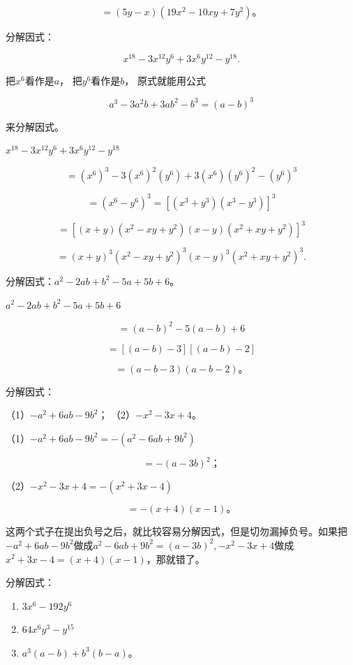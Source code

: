 \[
= (5 y - x) (19 x ^{2} - 10 x y + 7 y ^{2})\text{。}
\]

 分解因式：

\[
x ^{18} - 3 x ^{12} y ^{6} + 3 x ^{6} y ^{12} - y ^{18}.
\]

 把\(x^6\)看作是\(a\)， 把\(y^6\)看作是\(b\)，
原式就能用公式

\[
a ^{3} - 3 a ^{2} b + 3 a b ^{2} - b ^{3} = (a - b) ^{3}
\]

来分解因式。

\(x^{18} - 3x^{12}y^6 +3x^6 y^{12} - y^{18}\)

\[
= (x ^{6}) ^{3} - 3 (x ^{6}) ^{2} (y ^{6}) + 3 (x ^{6}) (y ^{6}) ^{2} - (y ^{6}) ^{3}
\]

\[
= \left(x ^{6} - y ^{6}\right) ^{3} = \left[ \left(x ^{3} + y ^{3}\right) \left(x ^{3} - y ^{3}\right) \right] ^{3}
\]

\[
= \left[ (x + y) \left(x ^{2} - x y + y ^{2}\right) (x - y) \left(x ^{2} + x y + y ^{2}\right) \right] ^{3}
\]

\[
= (x + y) ^{3} \left(x ^{2} - x y + y ^{2}\right) ^{3} (x - y) ^{3} \left(x ^{2} + x y + y ^{2}\right) ^{3}.
\]

 分解因式：\(a^{2} - 2ab + b^{2} - 5a + 5b + 6\)。

\(a^2 - 2ab + b^2 - 5a + 5b + 6\)

\[
= (a - b) ^{2} - 5 (a - b) + 6
\]

\[
= [ (a - b) - 3 ] [ (a - b) - 2 ]
\]

\[
= (a - b - 3) (a - b - 2)\text{。}
\]

 分解因式：

（1）\(-a^{2} + 6ab - 9b^{2}\)； （2）\(-x^{2} - 3x + 4\)。

 （1）\(-a^{2} + 6ab - 9b^{2} = -(a^{2} - 6ab + 9b^{2})\)

\[
= - (a - 3 b) ^{2}\text{；}
\]

（2）\(-x^{2} - 3x + 4 = -(x^{2} + 3x - 4)\)

\[
= - (x + 4) (x - 1)\text{。}
\]

这两个式子在提出负号之后，就比较容易分解因式，但是切勿漏掉负号。如果把\(-a^{2} + 6ab - 9b^{2}\)做成\(a^{2} - 6ab + 9b^{2} = (a - 3b)^{2}, -x^{2} - 3x + 4\)做成\(x^{2} + 3x - 4 = (x + 4)(x - 1)\)，那就错了。

分解因式：

\begin{enumerate}[start=1]
\item
  \(3x^{6}-192y^{6}\)
\item
  \(64x^{6}y^{3}-y^{15}\)
\item
  \(a^3 (a - b) + b^3 (b - a)\)。
\end{enumerate}

